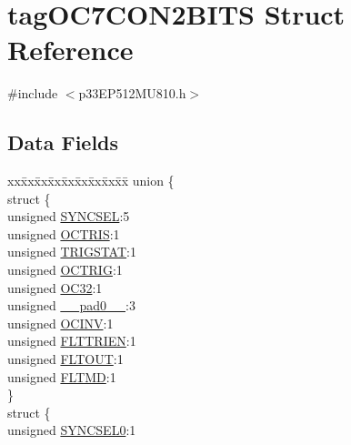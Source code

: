 \hypertarget{structtag_o_c7_c_o_n2_b_i_t_s}{}\section{tag\+O\+C7\+C\+O\+N2\+B\+I\+TS Struct Reference}
\label{structtag_o_c7_c_o_n2_b_i_t_s}


{\ttfamily \#include $<$p33\+E\+P512\+M\+U810.\+h$>$}

\subsection*{Data Fields}
\begin{DoxyCompactItemize}
\item 
\begin{tabbing}
xx\=xx\=xx\=xx\=xx\=xx\=xx\=xx\=xx\=\kill
union \{\\
\>struct \{\\
\>\>unsigned \hyperlink{structtag_o_c7_c_o_n2_b_i_t_s_a35fbbe11485c2615ed27535b62c3fa35}{SYNCSEL}:5\\
\>\>unsigned \hyperlink{structtag_o_c7_c_o_n2_b_i_t_s_ab849a74c6179282ed6b06cc047c80544}{OCTRIS}:1\\
\>\>unsigned \hyperlink{structtag_o_c7_c_o_n2_b_i_t_s_ab379549de54ac93ad4aa73686c34cb7c}{TRIGSTAT}:1\\
\>\>unsigned \hyperlink{structtag_o_c7_c_o_n2_b_i_t_s_a8d2cf9b996ef2b9079defa8950de798c}{OCTRIG}:1\\
\>\>unsigned \hyperlink{structtag_o_c7_c_o_n2_b_i_t_s_af52e127483a703e0fa84c7d4f1de0df4}{OC32}:1\\
\>\>unsigned \hyperlink{structtag_o_c7_c_o_n2_b_i_t_s_adf71f3d8410c1f1dbbc96680a92c49af}{\_\_pad0\_\_}:3\\
\>\>unsigned \hyperlink{structtag_o_c7_c_o_n2_b_i_t_s_a301004fca40c8d19d418866c92c19a06}{OCINV}:1\\
\>\>unsigned \hyperlink{structtag_o_c7_c_o_n2_b_i_t_s_ab979b75e02643aa840fb6ee50e0c30fa}{FLTTRIEN}:1\\
\>\>unsigned \hyperlink{structtag_o_c7_c_o_n2_b_i_t_s_ae466664b094d9c830e9ce20b86d7907f}{FLTOUT}:1\\
\>\>unsigned \hyperlink{structtag_o_c7_c_o_n2_b_i_t_s_a245ca3019d6c6ccbfb09f1c821146bb5}{FLTMD}:1\\
\>\} \\
\>struct \{\\
\>\>unsigned \hyperlink{structtag_o_c7_c_o_n2_b_i_t_s_a3b5df3154fde5141e6ac0156425ff8b4}{SYNCSEL0}:1\\

\end{tabbing}
\end{DoxyCompactItemize}

